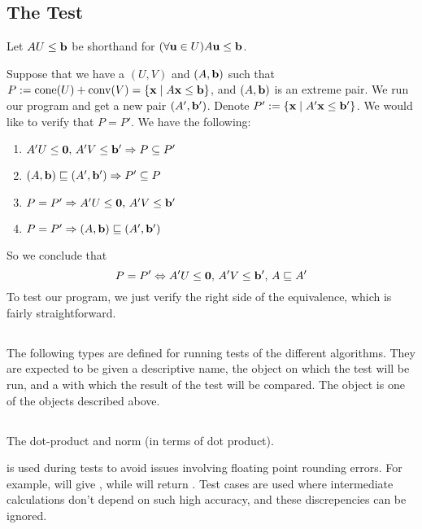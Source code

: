 \subsection{The Test}

Let $AU \leq \mathbf{b}$ be shorthand for $(\forall \mathbf{u}\in U) A\mathbf{u} \leq \mathbf{b}$.

Suppose that we have a $(U,V)$ and $(A,\mathbf{b})$ such that $P := \operatorname{cone}(U) + \operatorname{conv}(V) = \left\{\mathbf{x}\;|\; A\mathbf{x}\leq \mathbf{b}\right\}$, and $(A,\mathbf{b})$ is an extreme pair.  We run our program and get a new pair $(A',\mathbf{b}')$.  Denote $P' := \left\{\mathbf{x}\;|\; A'\mathbf{x}\leq \mathbf{b}'\right\}$.  We would like to verify that $P = P'$.  We have the following:
\begin{enumerate}
	\item $A'U\leq\mathbf{0},\, A'V\leq\mathbf{b}' \Rightarrow P \subseteq P'$
	\item $(A,\mathbf{b}) \sqsubseteq (A',\mathbf{b}') \Rightarrow P' \subseteq P$
	\item $P = P' \Rightarrow A'U\leq\mathbf{0},\, A'V\leq\mathbf{b}'$
	\item $P = P' \Rightarrow (A,\mathbf{b}) \sqsubseteq (A',\mathbf{b}')$
\end{enumerate}

So we conclude that
\[ P = P' \Leftrightarrow A'U\leq\mathbf{0},\,A'V\leq\mathbf{b}',\,A\sqsubseteq A' \]
To test our program, we just verify the right side of the equivalence, which is fairly straightforward.

\subsection{}

The following types are defined for running tests of the different algorithms.  They are expected to be given a descriptive name, the object on which the test will be run, and a  with which the result of the test will be compared.  The  object is one of the objects described above.
\lsthconetestcasea
\lstvconetestcasea
\lsthpolytestcaseb
\lstvpolytestcaseb

\subsection{}

The dot-product and norm (in terms of dot product).
\lstoperator
\lstnorm

 is used during tests to avoid issues involving floating point rounding errors.  For example,  will give , while  will return .  Test cases are used where intermediate calculations don't depend on such high accuracy, and these discrepencies can be ignored.

